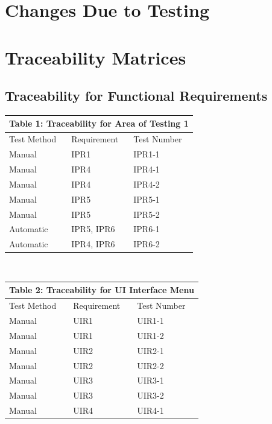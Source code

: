 \documentclass[12pt, titlepage]{article}
\begin{document}
\section{Changes Due to Testing}
	
\section{Traceability Matrices}
\subsection{Traceability for Functional Requirements}
\begin{tabular}{|p{}|p{}|p{}|}

\hline \multicolumn{3}{|c|}{Table 1: Traceability for Area of Testing 1}\\

\hline Test Method&Requirement&Test Number\\

\hline Manual&IPR1&IPR1-1\\

\hline Manual&IPR4&IPR4-1\\

\hline Manual&IPR4&IPR4-2\\

\hline Manual&IPR5&IPR5-1\\

\hline Manual&IPR5&IPR5-2\\

\hline Automatic&IPR5, IPR6&IPR6-1\\

\hline Automatic&IPR4, IPR6&IPR6-2\\

\hline

\end{tabular}
\\
\begin{tabular}{|p{}|p{}|p{}|}

\hline \multicolumn{3}{|c|}{Table 2: Traceability for UI Interface Menu}\\

\hline Test Method&Requirement&Test Number\\

\hline Manual&UIR1&UIR1-1\\

\hline Manual&UIR1&UIR1-2\\

\hline Manual&UIR2&UIR2-1\\

\hline Manual&UIR2&UIR2-2\\

\hline Manual&UIR3&UIR3-1\\

\hline Manual&UIR3&UIR3-2\\

\hline Manual&UIR4&UIR4-1\\

\hline

\end{tabular}
\end{document}
